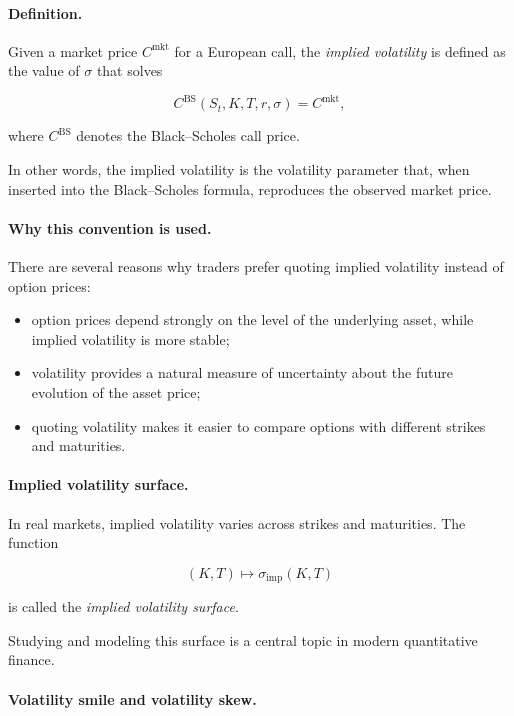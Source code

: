 \documentclass[11pt]{article}
\newcommand{\1}{\mathbf{1}}
\theoremstyle{plain}
\theoremstyle{definition}
\theoremstyle{remark}
\begin{document}
\paragraph{Definition.}

Given a market price \(C^{\text{mkt}}\) for a European call,
the \emph{implied volatility} is defined as the value of \(\sigma\)
that solves

\[
C^{\text{BS}}(S_t,K,T,r,\sigma) = C^{\text{mkt}},
\]

where \(C^{\text{BS}}\) denotes the Black--Scholes call price.

In other words, the implied volatility is the volatility parameter that,
when inserted into the Black--Scholes formula, reproduces the observed
market price.

\paragraph{Why this convention is used.}

There are several reasons why traders prefer quoting implied
volatility instead of option prices:

\begin{itemize}[leftmargin=1.4em]
\item option prices depend strongly on the level of the underlying asset,
while implied volatility is more stable;

\item volatility provides a natural measure of uncertainty about the
future evolution of the asset price;

\item quoting volatility makes it easier to compare options with
different strikes and maturities.
\end{itemize}

\paragraph{Implied volatility surface.}

In real markets, implied volatility varies across strikes and maturities.
The function

\[
(K,T) \mapsto \sigma_{\text{imp}}(K,T)
\]

is called the \emph{implied volatility surface}.

Studying and modeling this surface is a central topic in modern
quantitative finance.


\paragraph{Volatility smile and volatility skew.}
\end{document}
